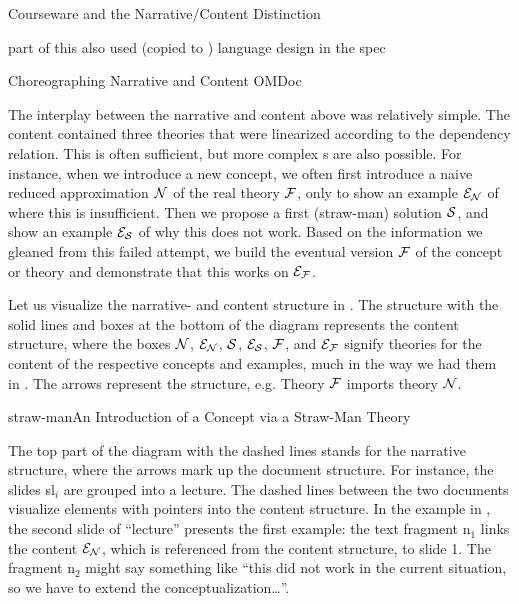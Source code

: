 \begin{omgroup}[id=courseware]{Courseware and the Narrative/Content Distinction}
\begin{oldpart}{part of this also used (copied to ) language design in the spec}
\begin{omgroup}[id=courseware.choreographing]{Choreographing  Narrative and Content OMDoc}

  The interplay between the narrative and content {\omdoc} above was relatively
  simple. The content {\omdoc} contained three theories that were linearized according to
  the dependency relation. This is often sufficient, but more complex
  {s} are also possible. For instance, when we
  introduce a new concept, we often first introduce a naive reduced approximation $\cal N$
  of the real theory $\cal F$, only to show an example $\cal E_N$ of where this is
  insufficient. Then we propose a first (straw-man) solution $\cal S$, and show an example
  $\cal E_S$ of why this does not work. Based on the information we gleaned from this
  failed attempt, we build the eventual version $\cal F$ of the concept or theory and
  demonstrate that this works on $\cal E_F$.

Let us visualize the narrative- and content structure in {}. The
structure with the solid lines and boxes at the bottom of the diagram represents the
content structure, where the boxes $\cal N$, $\cal E_N$, $\cal S$, $\cal E_S$, $\cal F$,
and $\cal E_F$ signify theories for the content of the respective concepts and examples,
much in the way we had them in {}. The arrows
represent the {} structure, e.g. Theory $\cal F$ imports
theory $\cal N$.

\begin{myfig}{straw-man}{An Introduction of a Concept via a Straw-Man Theory}
\end{myfig}

The top part of the diagram with the dashed lines stands for the narrative structure,
where the arrows mark up the document structure. For instance, the slides {sl$_i$} are
grouped into a lecture. The dashed lines between the two documents visualize {}
elements with pointers into the content structure. In the example in
{}, the second slide of ``lecture'' presents the first example: the
text fragment {n$_1$} links the content $\cal E_N$, which is referenced from the content
structure, to slide 1. The fragment {n$_2$} might say something like ``this did not work in
the current situation, so we have to extend the conceptualization\ldots''.


\end{omgroup}
\end{oldpart}
\end{omgroup}
